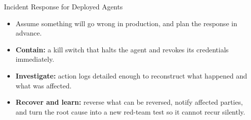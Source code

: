 \begin{frame}{Incident Response for Deployed Agents}
  \begin{itemize}\itemsep0.5em
    \item[\textcolor{KAred}{$\blacktriangleright$}] Assume something will go wrong in production, and plan the response in advance.
    \item[\textcolor{KAred}{$\blacktriangleright$}] \textbf{Contain:} a kill switch that halts the agent and revokes its credentials immediately.
    \item[\textcolor{KAred}{$\blacktriangleright$}] \textbf{Investigate:} action logs detailed enough to reconstruct what happened and what was affected.
    \item[\textcolor{KAred}{$\blacktriangleright$}] \textbf{Recover and learn:} reverse what can be reversed, notify affected parties, and turn the root cause into a new red-team test so it cannot recur silently.
  \end{itemize}
\end{frame}
